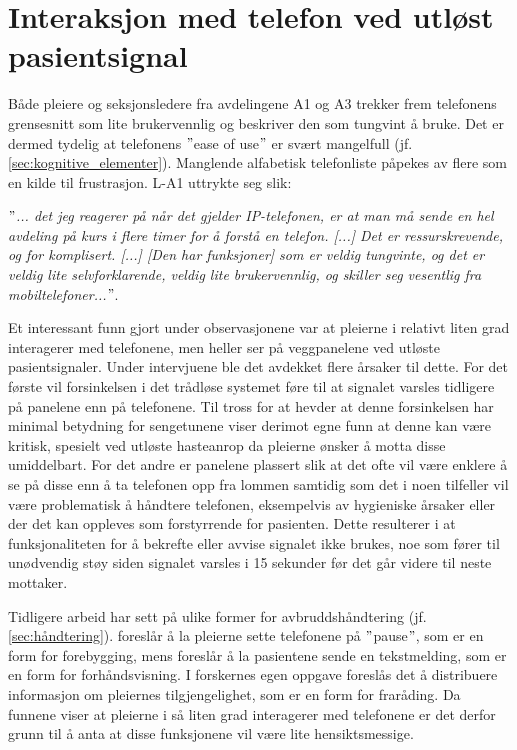 \section{Interaksjon med telefon ved utløst pasientsignal}
Både pleiere og seksjonsledere fra avdelingene A1 og A3 trekker frem telefonens grensesnitt som lite brukervennlig og beskriver den som tungvint å bruke. Det er dermed tydelig at telefonens $"$ease of use$"$ er svært mangelfull (jf. \ref{sec:kognitive_elementer}). Manglende alfabetisk telefonliste påpekes av flere som en kilde til frustrasjon. L-A1 uttrykte seg slik:

\noindent
\textit{ $"$... det jeg reagerer på når det gjelder IP-telefonen, er at man må sende en hel avdeling på kurs i flere timer for å forstå en telefon. [...] Det er ressurskrevende, og for komplisert. [...] [Den har funksjoner] som er veldig tungvinte, og det er veldig lite selvforklarende, veldig lite brukervennlig, og skiller seg vesentlig fra mobiltelefoner...$"$}.

\noindent
Et interessant funn gjort under observasjonene var at pleierne i relativt liten grad interagerer med telefonene, men heller ser på veggpanelene ved utløste pasientsignaler. Under intervjuene ble det avdekket flere årsaker til dette. For det første vil forsinkelsen i det trådløse systemet føre til at signalet varsles tidligere på panelene enn på telefonene. Til tross for at \citet{Sletten09} hevder at denne forsinkelsen har minimal betydning for sengetunene viser derimot egne funn at denne kan være kritisk, spesielt ved utløste hasteanrop da pleierne ønsker å motta disse umiddelbart. For det andre er panelene plassert slik at det ofte vil være enklere å se på disse enn å ta telefonen opp fra lommen samtidig som det i noen tilfeller vil være problematisk å håndtere telefonen, eksempelvis av hygieniske årsaker eller der det kan oppleves som forstyrrende for pasienten. Dette resulterer i at funksjonaliteten for å bekrefte eller avvise signalet ikke brukes, noe som fører til unødvendig støy siden signalet varsles i 15 sekunder før det går videre til neste mottaker. 

\noindent
Tidligere arbeid har sett på ulike former for avbruddshåndtering (jf. \ref{sec:håndtering}). \citet{Sletten09} foreslår å la pleierne sette telefonene på $"$pause$"$, som er en form for forebygging, mens \citet{Selseth12} foreslår å la pasientene sende en tekstmelding, som er en form for forhåndsvisning. I forskernes egen oppgave \citet{Sund13} foreslås det å distribuere informasjon om pleiernes tilgjengelighet, som er en form for fraråding. Da funnene viser at pleierne i så liten grad interagerer med telefonene er det derfor grunn til å anta at disse funksjonene vil være lite hensiktsmessige.

